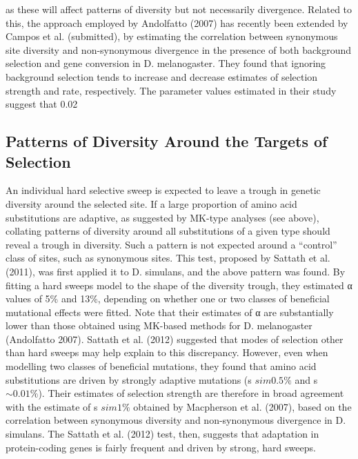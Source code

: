 as these will affect patterns of diversity but not necessarily divergence. Related to this, the approach employed by Andolfatto (2007) has recently been extended by Campos et al. (submitted), by estimating the correlation between synonymous site diversity and non-synonymous divergence in the presence of both background selection and gene conversion in D. melanogaster. They found that ignoring background selection tends to increase and decrease estimates of selection strength and rate, respectively. The parameter values estimated in their study suggest that 0.02%
 
\subsection{ Patterns of Diversity Around the Targets of Selection}
 
An individual hard selective sweep is expected to leave a trough in genetic diversity around the selected site. If a large proportion of amino acid substitutions are adaptive, as suggested by MK-type analyses (see above), collating patterns of diversity around all substitutions of a given type should reveal a trough in diversity. Such a pattern is not expected around a “control” class of sites, such as synonymous sites. This test, proposed by Sattath et al. (2011), was first applied it to D. simulans, and the above pattern was found. By fitting a hard sweeps model to the shape of the diversity trough, they estimated α values of  5\% and 13\%, depending on whether one or two classes of beneficial mutational effects were fitted. Note that their estimates of α are substantially lower than those obtained using MK-based methods for D. melanogaster (Andolfatto 2007). Sattath et al. (2012) suggested that modes of selection other than hard sweeps may help explain to this discrepancy. However, even when modelling two classes of beneficial mutations, they found that amino acid substitutions are driven by strongly adaptive mutations (s $sim0.5\%$ and s $\sim0.01\%$). Their estimates of selection strength are therefore in broad agreement with the estimate of s $sim1\%$ obtained by Macpherson et al. (2007), based on the correlation between synonymous diversity and non-synonymous divergence in D. simulans. The Sattath et al. (2012) test, then, suggests that adaptation in protein-coding genes is fairly frequent and driven by strong, hard sweeps.
 

